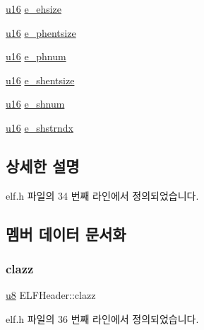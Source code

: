 \begin{DoxyCompactItemize}
\item 
\mbox{\hyperlink{_system_8h_a9e6c91d77e24643b888dbd1a1a590054}{u16}} \mbox{\hyperlink{struct_e_l_f_header_a5b0c2118b948227b82c61477348f5ce6}{e\+\_\+ehsize}}
\item 
\mbox{\hyperlink{_system_8h_a9e6c91d77e24643b888dbd1a1a590054}{u16}} \mbox{\hyperlink{struct_e_l_f_header_a54f6348c72b743df1298f14d9727ee63}{e\+\_\+phentsize}}
\item 
\mbox{\hyperlink{_system_8h_a9e6c91d77e24643b888dbd1a1a590054}{u16}} \mbox{\hyperlink{struct_e_l_f_header_a40ea098754df174746d084dd4ac1322d}{e\+\_\+phnum}}
\item 
\mbox{\hyperlink{_system_8h_a9e6c91d77e24643b888dbd1a1a590054}{u16}} \mbox{\hyperlink{struct_e_l_f_header_a6fea1910b959192096e6391950e55e12}{e\+\_\+shentsize}}
\item 
\mbox{\hyperlink{_system_8h_a9e6c91d77e24643b888dbd1a1a590054}{u16}} \mbox{\hyperlink{struct_e_l_f_header_a269f1c30e9f4a79074b4914243f83497}{e\+\_\+shnum}}
\item 
\mbox{\hyperlink{_system_8h_a9e6c91d77e24643b888dbd1a1a590054}{u16}} \mbox{\hyperlink{struct_e_l_f_header_a06d7be4a0c5eb3ffcf9e6adade39949c}{e\+\_\+shstrndx}}
\end{DoxyCompactItemize}


\subsection{상세한 설명}


elf.\+h 파일의 34 번째 라인에서 정의되었습니다.



\subsection{멤버 데이터 문서화}
\mbox{\label{struct_e_l_f_header_a0fc22a0f7de5c991bf26ed09f4090b0a}} 
\subsubsection{\texorpdfstring{clazz}{clazz}}
{\footnotesize\ttfamily \mbox{\hyperlink{_system_8h_aed742c436da53c1080638ce6ef7d13de}{u8}} E\+L\+F\+Header\+::clazz}



elf.\+h 파일의 36 번째 라인에서 정의되었습니다.

